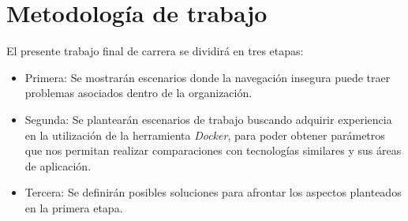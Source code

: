 \section{Metodología de trabajo}
\noindent El presente trabajo final de carrera se dividirá en tres etapas:
\begin{itemize}
    \setlength\itemsep{-0.6em}
    \item Primera: Se mostrarán escenarios donde la navegación insegura puede traer problemas 
asociados dentro de la organización. 
    \item Segunda: Se plantearán escenarios de trabajo buscando adquirir experiencia en la 
utilización de la herramienta \emph{Docker}, para poder obtener parámetros que nos permitan 
realizar comparaciones con tecnologías similares y sus áreas de aplicación.
    \item Tercera: Se definirán posibles soluciones para afrontar 
los aspectos planteados en la primera etapa. 
\end{itemize}



